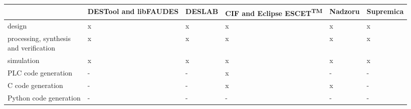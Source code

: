 \begin{table}[h!]
    \small
    \begin{tabularx}{\textwidth}{>{\raggedright\arraybackslash}l|>{\centering\arraybackslash}X|>{\centering\arraybackslash}X|>{\centering\arraybackslash}X|>{\centering\arraybackslash}X|>{\centering\arraybackslash}X}
    & DESTool and libFAUDES \cite{Moor2008}
    & DESLAB \cite{Clavijo2012}
    & CIF and Eclipse ESCET\textsuperscript{TM} \cite{Beek2014, Fokkink2023}
    & Nadzoru \cite{Pinheiro2015} 
    & Supremica \cite{Supremica} \\
    \hline
    design                                 & x & x & x & x & x \\
    \hline
    \makecell[l]{processing, synthesis \\and verification} & x & x & x & x & x \\
    \hline
    simulation                             & x & x & x & x & x \\
    \hline
    PLC code generation                    & - & - & x & - & - \\
    \hline
    C code generation                      & - & - & x & x & - \\
    \hline
    Python code generation                 & - & - & - & - & - \\
    \end{tabularx}
    \end{table}
    